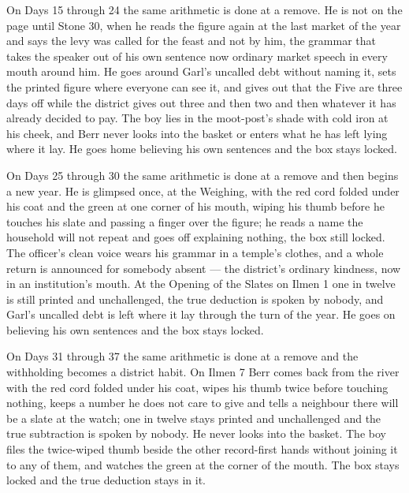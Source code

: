 \documentclass{design/chronicle}
\begin{document}
{On Days 15 through 24 the same arithmetic is done at a remove. He is not on the page until Stone 30, when he reads the figure again at the last market of the year and says the levy was called for the feast and not by him, the grammar that takes the speaker out of his own sentence now ordinary market speech in every mouth around him. He goes around Garl’s uncalled debt without naming it, sets the printed figure where everyone can see it, and gives out that the Five are three days off while the district gives out three and then two and then whatever it has already decided to pay. The boy lies in the moot-post’s shade with cold iron at his cheek, and Berr never looks into the basket or enters what he has left lying where it lay. He goes home believing his own sentences and the box stays locked.

On Days 25 through 30 the same arithmetic is done at a remove and then begins a new year. He is glimpsed once, at the Weighing, with the red cord folded under his coat and the green at one corner of his mouth, wiping his thumb before he touches his slate and passing a finger over the figure; he reads a name the household will not repeat and goes off explaining nothing, the box still locked. The officer’s clean voice wears his grammar in a temple’s clothes, and a whole return is announced for somebody absent --- the district’s ordinary kindness, now in an institution’s mouth. At the Opening of the Slates on Ilmen 1 one in twelve is still printed and unchallenged, the true deduction is spoken by nobody, and Garl’s uncalled debt is left where it lay through the turn of the year. He goes on believing his own sentences and the box stays locked.

On Days 31 through 37 the same arithmetic is done at a remove and the withholding becomes a district habit. On Ilmen 7 Berr comes back from the river with the red cord folded under his coat, wipes his thumb twice before touching nothing, keeps a number he does not care to give and tells a neighbour there will be a slate at the watch; one in twelve stays printed and unchallenged and the true subtraction is spoken by nobody. He never looks into the basket. The boy files the twice-wiped thumb beside the other record-first hands without joining it to any of them, and watches the green at the corner of the mouth. The box stays locked and the true deduction stays in it.

}
\end{document}
